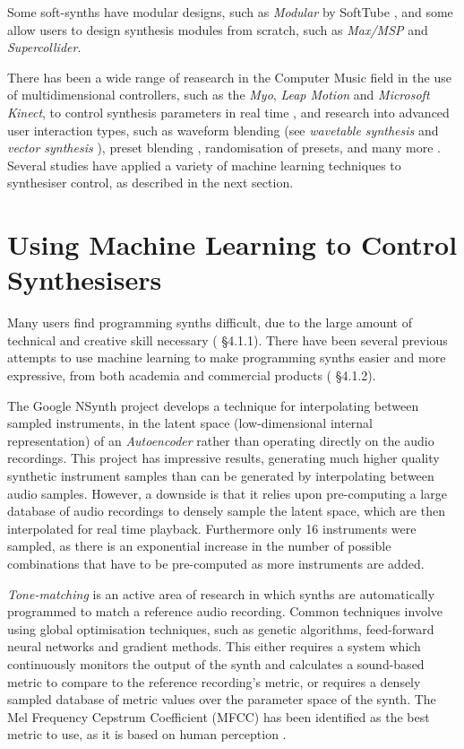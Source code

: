 \documentclass[11pt, oneside]{report}   	%
\begin{document}
Some soft-synths have modular designs, such as \emph{Modular} by SoftTube \cite{SoftTube},
and some allow users to design synthesis modules from scratch, such as \emph{Max/MSP} and \emph{Supercollider}.

There has been a wide range of reasearch in the Computer Music field in the use of multidimensional controllers, such as the  \emph{Myo}, \emph{Leap Motion} and \emph{Microsoft Kinect}, to control synthesis parameters in real time \cite{ICMC, TubbThesis}, and research into advanced user interaction types, such as waveform blending (see \emph{wavetable synthesis} \cite{Wavetable} and \emph{vector synthesis} \cite{SY22}), preset blending \cite{Interpolation}, randomisation of presets, and many more \cite{YeeKing, EvolvedAudioEffects}.  Several studies have applied a variety of machine learning techniques to synthesiser control, as described in the next section.

\section{Using Machine Learning to Control Synthesisers}\label{MachineLearning}
Many users find programming synths difficult, due to the large amount of technical and creative skill necessary (\cite{YeeKing} \S 4.1.1). There have been several previous attempts to use machine learning to make programming synths easier and more expressive, from both academia and commercial products (\cite{YeeKing} \S 4.1.2).

The Google NSynth project \cite{NSynth} develops a technique for interpolating between sampled instruments, in the latent space (low-dimensional internal representation) of an \emph{Autoencoder} rather than operating directly on the audio recordings. This project has impressive results, generating much higher quality synthetic instrument samples than can be generated by interpolating between audio samples. However, a downside is that it relies upon pre-computing a large database of audio recordings to densely sample the latent space, which are then interpolated for real time playback. Furthermore only 16 instruments were sampled, as there is an exponential increase in the number of possible combinations that have to be pre-computed as more instruments are added.

\emph{Tone-matching} is an active area of research in which synths are automatically programmed to match a reference audio recording. Common techniques involve using global optimisation techniques, such as genetic algorithms, feed-forward neural networks and gradient methods. This either requires a system which continuously monitors the output of the synth and calculates a sound-based metric to compare to the reference recording's metric, or requires a densely sampled database of metric values over the parameter space of the synth.  The Mel Frequency Cepstrum Coefficient (MFCC) has been identified as the best metric to use, as it is based on human perception \cite{YeeKing}.
\end{document}
